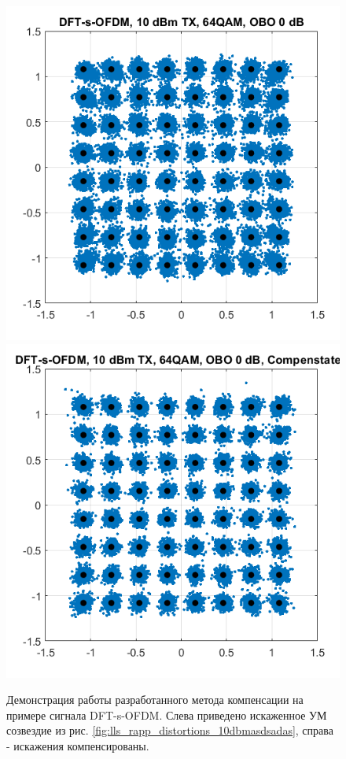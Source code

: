 \begin{figure}[h!]
    \centering
    \includegraphics[width=0.45\linewidth]{figs/dfts_10dbm_obo0_uncompensated.png}
    \includegraphics[width=0.45\linewidth]{figs/dfts_10dbm_obo0_compensated.png}
    \caption{Демонстрация работы разработанного метода компенсации на
    примере сигнала DFT-s-OFDM. Слева приведено искаженное УМ созвездие из
    рис. \ref{fig:lls_rapp_distortions_10dbmasdsadas}, справа - искажения
    компенсированы. }
    \label{fig:dfts_lls_compensation_10dbm}
\end{figure}